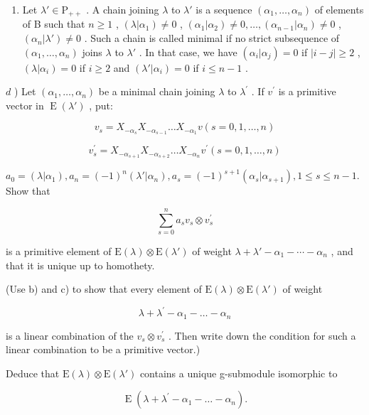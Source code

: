 \begin{enumerate}
\def\labelenumi{\alph{enumi})}
\setcounter{enumi}{2}
\tightlist
\item
  Let \(\lambda' \in \mathrm{P}_{++}\) . A chain joining \(\lambda\) to \(\lambda'\) is a sequence \((\alpha_1, \ldots, \alpha_n)\) of elements of B such that \(n \geq 1\) , \((\lambda|\alpha_1) \neq 0\) , \((\alpha_1|\alpha_2) \neq 0, \ldots, (\alpha_{n-1}|\alpha_n) \neq 0\) , \((\alpha_n|\lambda') \neq 0\) . Such a chain is called minimal if no strict subsequence of \((\alpha_1, \ldots, \alpha_n)\) joins \(\lambda\) to \(\lambda'\) . In that case, we have \((\alpha_i|\alpha_j) = 0\) if \(|i - j| \geq 2\) , \((\lambda|\alpha_i) = 0\) if \(i \geq 2\) and \((\lambda'|\alpha_i) = 0\) if \(i \leq n - 1\) .
\end{enumerate}

\(d\) ) Let \((\alpha_{1},\ldots ,\alpha_{n})\) be a minimal chain joining \(\lambda\) to \(\lambda^{\prime}\) . If \(v^{\prime}\) is a primitive vector in \(\operatorname {E}(\lambda ')\) , put:

\[
v _ {s} = X _ {- \alpha_ {s}} X _ {- \alpha_ {s - 1}} \ldots X _ {- \alpha_ {1}} v (s = 0, 1, \ldots , n)
\]

\[
v _ {s} ^ {\prime} = X _ {- \alpha_ {s + 1}} X _ {- \alpha_ {s + 2}} \dots X _ {- \alpha_ {n}} v ^ {\prime} (s = 0, 1, \ldots , n)
\]

\(a_0 = (\lambda |\alpha_1), a_n = (-1)^n (\lambda '|\alpha_n), a_s = (-1)^{s + 1}(\alpha_s|\alpha_{s + 1}), 1 \leq s \leq n - 1.\) Show that

\[
\sum_ {s = 0} ^ {n} a _ {s} v _ {s} \otimes v _ {s} ^ {\prime}
\]

is a primitive element of \(\mathrm{E}(\lambda)\otimes\mathrm{E}(\lambda')\) of weight \(\lambda+\lambda'-\alpha_{1}-\cdots-\alpha_{n}\) , and that it is unique up to homothety.

(Use b) and c) to show that every element of \(\mathrm{E}(\lambda) \otimes \mathrm{E}(\lambda')\) of weight

\[
\lambda + \lambda^ {\prime} - \alpha_ {1} - \dots - \alpha_ {n}
\]

is a linear combination of the \(v_{s} \otimes v_{s}^{\prime}\) . Then write down the condition for such a linear combination to be a primitive vector.)

Deduce that \(\mathrm{E}(\lambda) \otimes \mathrm{E}(\lambda')\) contains a unique g-submodule isomorphic to

\[
\operatorname{E} \left(\lambda + \lambda^ {\prime} - \alpha_ {1} - \dots - \alpha_ {n}\right).
\]


